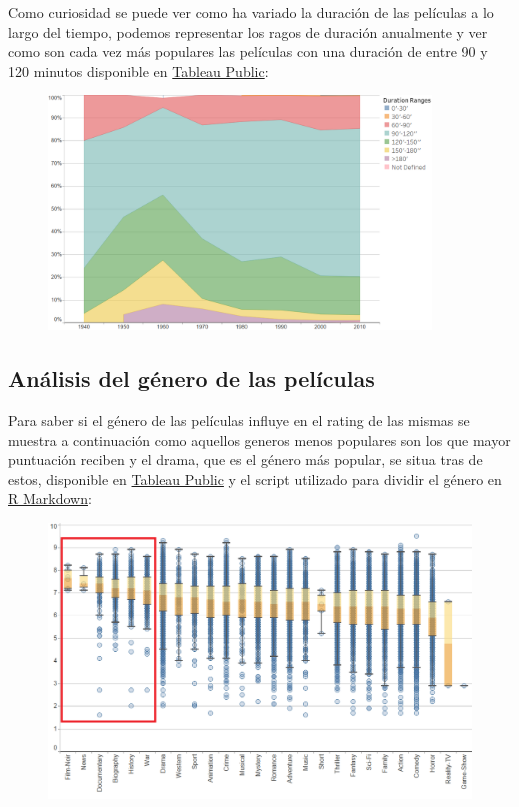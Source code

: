 \documentclass{article}
\begin{document}
Como curiosidad se puede ver como ha variado la duración de las películas a lo largo del tiempo\cite{justgeek}, podemos representar los ragos de duración anualmente y ver como son cada vez más populares las películas con una duración de entre 90 y 120 minutos disponible en \href{https://public.tableau.com/profile/javier6580\#!/vizhome/proyecto_fin_de_master_dataset/duration_year}{Tableau Public}:

\begin{figure}[h]
\centering
\includegraphics[width=4in,clip,keepaspectratio]{./images/duration_year}
\end{figure}


\clearpage

\subsection{Análisis del género de las películas}

Para saber si el género de las películas influye en el rating de las mismas se muestra a continuación como aquellos generos menos populares son los que mayor puntuación reciben y el drama, que es el género más popular, se situa tras de estos, disponible en \href{https://public.tableau.com/profile/javier6580\#!/vizhome/proyecto_fin_de_master_dataset/rating_genre}{Tableau Public} y el script utilizado para dividir el género en \href{https://github.com/pozueco/proyecto_fin_de_master/blob/master/split_genres.md}{R Markdown}:

\begin{figure}[h]
\centering
\includegraphics[width=4.5in,clip,keepaspectratio]{./images/rating_genre}
\end{figure}
\end{document}

